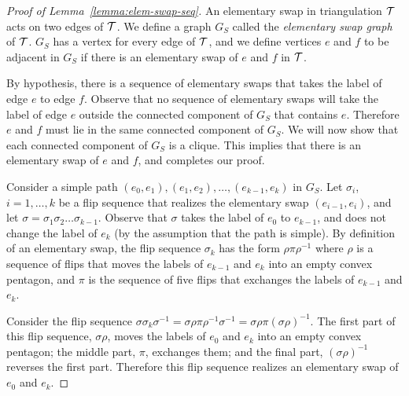 \begin{proof}[Proof of Lemma~\ref{lemma:elem-swap-seq}]
An elementary swap in triangulation $\cal T$ acts on two edges of $\cal T$.  
We define a graph $G_S$ called the \emph{elementary swap graph} of $\cal T$. 
$G_S$ has a vertex for every edge of $\cal T$, and we define vertices $e$ and $f$ to be adjacent in $G_S$ if there is an elementary swap  of $e$ and $f$ in $\cal T$. 

By hypothesis, there is a sequence of elementary swaps that takes the label of edge $e$ to edge $f$.
Observe that no sequence of elementary swaps will take the label of edge $e$ outside the connected component of $G_S$ that contains $e$.
Therefore $e$ and $f$ must lie in the same connected component of $G_S$.  
We will now show that 
each connected component of $G_S$ is a clique.  This implies that there is an 
elementary swap of $e$ and $f$, and completes our proof.

Consider a simple path $(e_0,e_1), (e_1, e_2), \ldots, (e_{k-1}, e_k)$ in $G_S$.  
Let $\sigma_i$, $i=1, \ldots, k$ be a flip sequence that realizes the elementary swap $(e_{i-1}, e_i)$, and let $\sigma = \sigma_1 \sigma_2 \ldots \sigma_{k-1}$.  Observe that $\sigma$ takes the label of $e_0$ to $e_{k-1}$, and does not change the label of $e_k$ (by the assumption that the path is simple).
By definition of an elementary swap, the flip sequence $\sigma_k$ has the form $\rho \pi \rho^{-1}$ where $\rho$ is a sequence of flips that moves the labels of $e_{k-1}$ and $e_k$ into an empty convex pentagon, and $\pi$ is the sequence of five flips that exchanges the labels of $e_{k-1}$ and $e_k$. 

Consider the flip sequence  $\sigma \sigma_k \sigma^{-1} = \sigma \rho \pi \rho^{-1} \sigma^{-1} = \sigma \rho \pi (\sigma \rho)^{-1}$. 
The first part of this flip sequence, $\sigma \rho$, moves the labels of $e_0$ and $e_k$ into an empty convex pentagon; the middle part, $\pi$, exchanges them; and the final part, $(\sigma \rho)^{-1}$ reverses the first part.  Therefore this flip sequence realizes an elementary swap of $e_0$   
and $e_k$.  
\end{proof}



